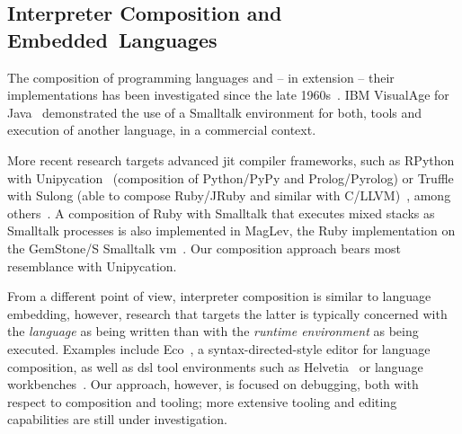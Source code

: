 \documentclass[sigconf,english]{acmart}
\newcommand{\ac}[1]{\gls*{#1}}
\newcommand*\jit{\ac{jit} compiler\xspace}
\begin{document}
\subsection{Interpreter Composition and Embedded~Languages}


The composition of programming languages and \--- in extension \--- their
implementations has been investigated since the late
1960s~\cite{cheatham:1969:motivation-extensible}.
IBM VisualAge for Java~\cite{Chamberland:1998:IVJ:1012144.1012152} demonstrated
the use of a Smalltalk environment for both, tools and execution of another
language, in a commercial context.

More recent research targets advanced \jit frameworks, such as RPython with
Unipycation~\cite{barrett2013unipycation} (composition of Python\slash PyPy and
Prolog\slash Pyrolog) or Truffle with Sulong (able to compose Ruby\slash JRuby
and similar with C\slash LLVM)~\cite{grimmer+:2015:dynamically-composing}, among
others~\cite{barrett2015approaches}. A composition of Ruby with Smalltalk that
executes mixed stacks as Smalltalk processes is also implemented in MagLev, the
Ruby implementation on the GemStone/S Smalltalk
\ac{vm}~\cite{springer2016inter}. Our composition approach bears most
resemblance with Unipycation.

From a different point of view, interpreter composition is similar to language
embedding, however, research that targets the latter is typically concerned
with the \emph{language} as being written than with the
\emph{runtime environment} as being executed.
Examples include Eco~\cite{diekmann2014eco}, a syntax-directed-style
editor for language composition, as well as \ac{dsl} tool environments such as
Helvetia~\cite{renggli2010embedding} or language
workbenches~\cite{erdweg+:2013:state-language}. Our approach, however, is
focused on debugging, both with respect to composition and tooling; more
extensive tooling and editing capabilities are still under investigation.
\end{document}
